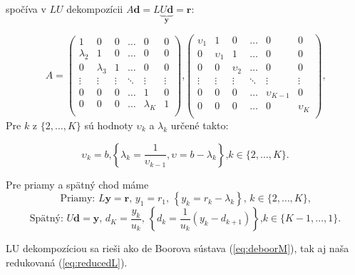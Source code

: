 \documentclass{rnthesis}
\begin{document}
spočíva v $LU$ dekompozícii $A\mathbf{d} = L\underbrace{U\mathbf{d}}_{\mathbf{y}} = \mathbf{r}$:

\begin{equation}
A = 
\begin{pmatrix}
1 & 0 & 0 & \hdots & 0 & 0\\
\lambda_2 & 1 & 0 & \hdots & 0 & 0\\
0 & \lambda_3 & 1 & \hdots & 0 & 0\\
\vdots & \vdots & \vdots & \ddots & \vdots & \vdots\\
0 & 0 & 0 & \hdots & 1 & 0 \\
0 & 0 & 0 & \hdots & \lambda_{K} & 1\\
\end{pmatrix} \text{,}
\begin{pmatrix}
\upsilon_1 & 1 & 0 & \hdots & 0 & 0\\
0 & \upsilon_1 & 1 & \hdots & 0 & 0\\
0 & 0 & \upsilon_2 & \hdots & 0 & 0\\
\vdots & \vdots & \vdots & \ddots & \vdots & \vdots\\
0 & 0 & 0 & \hdots & \upsilon_{K-1} & 0 \\
0 & 0 & 0 & \hdots & 0 & \upsilon_K\\
\end{pmatrix}\text{,}
\end{equation}
\newline
Pre $k$ z $\{2, \dots, K\}$ sú hodnoty $\upsilon_k$ a $\lambda_k$ určené takto:

\begin{equation} \label{eq:LU}
\upsilon_k = b \text{,} \left\{ \lambda_k = \frac{1}{\upsilon_{k-1}}, \upsilon = b - \lambda_k\right\} \text{,} k \in \{2, \dots, K\}\text{.}
\end{equation}

Pre priamy a spätný chod máme
\begin{equation} \label{eq:FwLy}
\text{Priamy: } L\mathbf{y} = \mathbf{r} \text{, } y_1 = r_1 \text{, } \left\{ y_k = r_k - \lambda_k\right\} \text{, } k \in \{2, \dots, K\}\text{,}
\end{equation}
\begin{equation} \label{eq:BwUd}
\text{Spätný: } U\mathbf{d} = \mathbf{y} \text{, } d_K = \frac{y_k}{u_k} \text{, } \left\{ d_k = \frac{1}{u_k}(y_k - d_{k+1})\right\} \text{,} k \in \{K-1, \dots, 1\}\text{.}
\end{equation}

LU dekompozíciou sa rieši ako de Boorova sústava (\ref{eq:deboorM}), tak aj naša redukovaná (\ref{eq:reducedL}).
\end{document}
